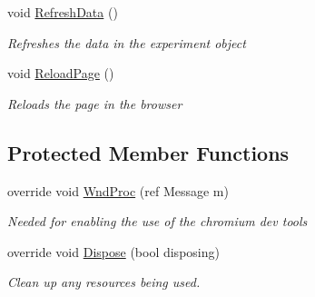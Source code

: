 \begin{DoxyCompactItemize}
void \hyperlink{class_web_analyzer_1_1_u_i_1_1_h_t_m_l_u_i_a25ca61f40127be0b7d381bbd17c0fd5e}{Refresh\+Data} ()
\begin{DoxyCompactList}\small\item\em Refreshes the data in the experiment object \end{DoxyCompactList}\item 
void \hyperlink{class_web_analyzer_1_1_u_i_1_1_h_t_m_l_u_i_a32d0bf8581afa8af866438d4ee76dd9f}{Reload\+Page} ()
\begin{DoxyCompactList}\small\item\em Reloads the page in the browser \end{DoxyCompactList}\end{DoxyCompactItemize}
\subsection*{Protected Member Functions}
\begin{DoxyCompactItemize}
\item 
override void \hyperlink{class_web_analyzer_1_1_u_i_1_1_h_t_m_l_u_i_a69b6ae98230372240893525305c0f4c2}{Wnd\+Proc} (ref Message m)
\begin{DoxyCompactList}\small\item\em Needed for enabling the use of the chromium dev tools \end{DoxyCompactList}\item 
override void \hyperlink{class_web_analyzer_1_1_u_i_1_1_h_t_m_l_u_i_a8f64d2d40440500ce68bea7174c191bb}{Dispose} (bool disposing)
\begin{DoxyCompactList}\small\item\em Clean up any resources being used. \end{DoxyCompactList}\end{DoxyCompactItemize}
